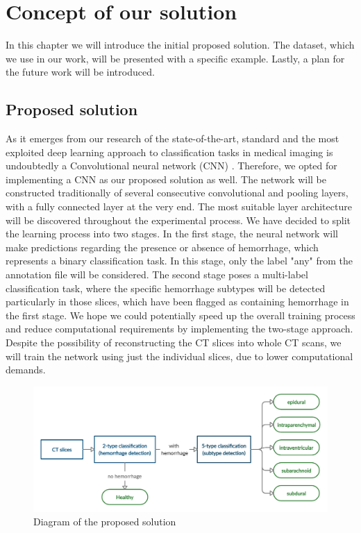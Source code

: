 

\chapter{Concept of our solution} %
In this chapter we will introduce the initial proposed solution. The dataset, which we use in our work, will be presented with a specific example. Lastly, a plan for the future work will be introduced.
\section{Proposed solution}
As it emerges from our research of the state-of-the-art, standard and the most exploited deep learning approach to classification tasks in medical imaging is undoubtedly a Convolutional neural network (CNN) \cite{relatedWork1, relatedWork2, relatedWork3}. Therefore, we opted for implementing a CNN as our proposed solution as well. The network will be constructed traditionally of several consecutive convolutional and pooling layers, with a fully connected layer at the very end. The most suitable layer architecture will be discovered throughout the experimental process. We have decided to split the learning process into two stages. In the first stage, the neural network will make predictions regarding the presence or absence of hemorrhage, which represents a binary classification task. In this stage, only the label "any" from the annotation file will be considered. The second stage poses a multi-label classification task, where the specific hemorrhage subtypes will be detected particularly in those slices, which have been flagged as containing hemorrhage in the first stage. We hope we could potentially speed up the overall training process and reduce computational requirements by implementing the two-stage approach. Despite the possibility of reconstructing the CT slices into whole CT scans, we will train the network using just the individual slices, due to lower computational demands.
\begin{figure}[h]
\begin{centering}
\includegraphics[width=14cm]{assets/images/mySolution.png}
\par\end{centering}
\caption{Diagram of the proposed solution \label{fig:solution}}
\end{figure}

